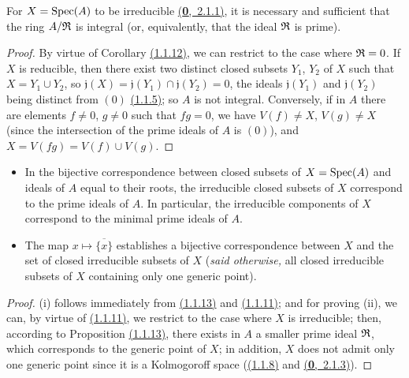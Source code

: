 \begin{prop}[1.1.13]
\label{prop-1.1.1.13}
For $X={\mathop{\mathrm{Spec}}\nolimits}(A)$ to be irreducible \hyperref[env-0.2.1.1]{(\textbf{0},~2.1.1)}, it is necessary and
sufficient that the ring $A/\mathfrak{R}$ is integral (or, equivalently, that the ideal $\mathfrak{R}$ is prime).
\end{prop}

\begin{proof}
\label{proof-prop-1.1.1.13}
By virtue of Corollary \hyperref[cor-1.1.1.12]{(1.1.12)}, we can restrict to the case where
$\mathfrak{R}=0$. If $X$ is reducible, then there exist two distinct closed subsets $Y_1$, $Y_2$
of $X$ such that $X=Y_1\cup Y_2$, so $\mathfrak{j}(X)=\mathfrak{j}(Y_1)\cap\mathfrak{j}(Y_2)=0$,
the ideals $\mathfrak{j}(Y_1)$ and $\mathfrak{j}(Y_2)$ being distinct from $(0)$
\hyperref[cor-1.1.1.5]{(1.1.5)}; so $A$ is not integral. Conversely, if in $A$ there are
elements $f\neq 0$, $g\neq 0$ such that $fg=0$, we have $V(f)\neq X$, $V(g)\neq X$ (since the
intersection of the prime ideals of $A$ is $(0)$), and $X=V(fg)=V(f)\cup V(g)$.
\end{proof}

\begin{cor}[1.1.14]
\label{cor-1.1.1.14}
\medskip\noindent
\begin{itemize}
  \item[{\rm(i)}] In the bijective correspondence between closed subsets of $X={\mathop{\mathrm{Spec}}\nolimits}(A)$
    and ideals of $A$ equal to their roots, the irreducible closed subsets
    of $X$ correspond to the prime ideals of $A$. In particular, the irreducible
    components of $X$ correspond to the minimal prime ideals of $A$.
  \item[{\rm(ii)}] The map $x\mapsto\overline{\{x\}}$ establishes a bijective correspondence
    between $X$ and the set of closed irreducible subsets of $X$ ({\em said otherwise,} all
    closed irreducible subsets of $X$ containing only one generic point).
\end{itemize}
\end{cor}

\begin{proof}
\label{proof-cor-1.1.1.14}
(i) follows immediately from \hyperref[prop-1.1.1.13]{(1.1.13)} and
\hyperref[prop-1.1.1.11]{(1.1.11)}; and for
proving (ii), we can, by virtue of \hyperref[prop-1.1.1.11]{(1.1.11)}, we restrict to the
case where $X$ is irreducible; then, according to
Proposition \hyperref[prop-1.1.1.13]{(1.1.13)}, there exists
in $A$ a smaller prime ideal $\mathfrak{R}$, which corresponds to the generic point
of $X$; in addition, $X$ does not admit only one generic point since it is a Kolmogoroff
space (\hyperref[cor-1.1.1.8]{(1.1.8)} and \hyperref[env-0.2.1.3]{(\textbf{0},~2.1.3)}).
\end{proof}

